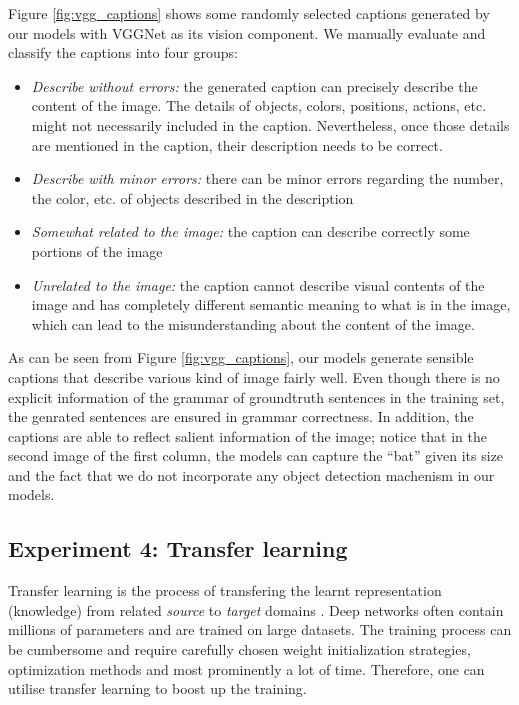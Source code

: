 \begin{itemize}
Figure \ref{fig:vgg_captions} shows some randomly selected captions generated by our models with VGGNet as its vision component. We manually evaluate and classify the captions into four groups:

\begin{itemize}
	\item \textit{Describe without errors:} the generated caption can precisely describe the content of the image. The details of objects, colors, positions, actions, etc. might not necessarily included in the caption. Nevertheless, once those details are mentioned in the caption, their description needs to be correct.
	\item \textit{Describe with minor errors:} there can be minor errors regarding the number, the color, etc. of objects described in the description
	\item \textit{Somewhat related to the image:} the caption can describe correctly some portions of the image
	\item \textit{Unrelated to the image:} the caption cannot describe visual contents of the image and has completely different semantic meaning to what is in the image, which can lead to the misunderstanding about the content of the image.
\end{itemize}

As can be seen from Figure \ref{fig:vgg_captions}, our models generate sensible captions that describe various kind of image fairly well. Even though there is no explicit information of the grammar of groundtruth sentences in the training set, the genrated sentences are ensured in grammar correctness. In addition, the captions are able to reflect salient information of the image; notice that in the second image of the first column, the models can capture the ``bat'' given its size and the fact that we do not incorporate any object detection machenism in our models.

\subsection{Experiment 4: Transfer learning}
\label{exp:transfer_learning}

Transfer learning is the process of transfering the learnt representation (knowledge) from related \textit{source} to \textit{target} domains \cite{Pan:2010:STL:1850483.1850545}. Deep networks often contain millions of parameters and are trained on large datasets. The training process can be cumbersome and require carefully chosen weight initialization strategies, optimization methods and most prominently a lot of time. Therefore, one can utilise transfer learning to boost up the training. 


\end{itemize}
